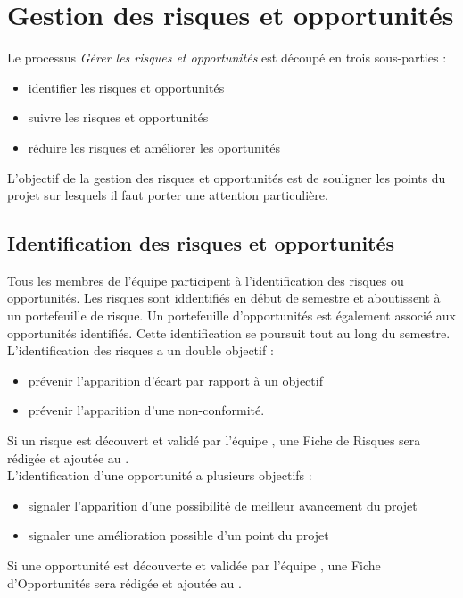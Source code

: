 \section{Gestion des risques et opportunités} 

Le processus \textit{Gérer les risques et opportunités} est découpé en trois sous-parties : 
\begin{itemize}
\item identifier les risques et opportunités
\item suivre les risques et opportunités
\item réduire les risques et améliorer les oportunités \\
\end{itemize}

L'objectif de la gestion des risques et opportunités est de souligner les points du projet sur lesquels il faut porter une attention particulière. 

\subsection{Identification des risques et opportunités}

Tous les membres de l'équipe participent à l'identification des risques ou opportunités. Les risques sont iddentifiés en début de semestre et aboutissent à un portefeuille de risque. Un portefeuille d'opportunités est également associé aux opportunités identifiés. Cette identification se poursuit tout au long du semestre. \\ 

L'identification des risques a un double objectif : 
\begin{itemize}
\item prévenir l'apparition d'écart par rapport à un objectif 
\item prévenir l'apparition d'une non-conformité. \\
\end{itemize}
Si un risque est découvert et validé par l'équipe \PICCourt{}, une Fiche de Risques sera rédigée et ajoutée au \PR.\\

L'identification d'une opportunité a plusieurs objectifs : 
\begin{itemize}
\item signaler l'apparition d'une possibilité de meilleur avancement du projet 
\item signaler  une amélioration possible d'un point du projet\\
\end{itemize}
Si une opportunité est découverte et validée par l'équipe \PICCourt, une Fiche d'Opportunités sera rédigée et ajoutée au \PO. \\


